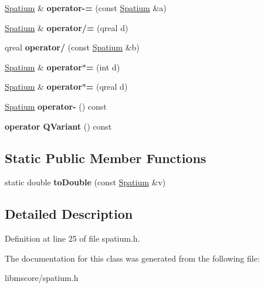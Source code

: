 \begin{DoxyCompactItemize}
\item 
\mbox{\label{class_ms_1_1_spatium_a58f8f9d523ea2f5b15345951e533bc24}} 
\hyperlink{class_ms_1_1_spatium}{Spatium} \& {\bfseries operator-\/=} (const \hyperlink{class_ms_1_1_spatium}{Spatium} \&a)
\item 
\mbox{\label{class_ms_1_1_spatium_aa618544034d2a8d408b3aad37be7c6df}} 
\hyperlink{class_ms_1_1_spatium}{Spatium} \& {\bfseries operator/=} (qreal d)
\item 
\mbox{\label{class_ms_1_1_spatium_a7d57a81bd0051e3364cdf82164e5c8df}} 
qreal {\bfseries operator/} (const \hyperlink{class_ms_1_1_spatium}{Spatium} \&b)
\item 
\mbox{\label{class_ms_1_1_spatium_a182fdadaf628a8658b4c7b4dd1a726c3}} 
\hyperlink{class_ms_1_1_spatium}{Spatium} \& {\bfseries operator$\ast$=} (int d)
\item 
\mbox{\label{class_ms_1_1_spatium_a1a97bd27476c723439bc07702ceef71c}} 
\hyperlink{class_ms_1_1_spatium}{Spatium} \& {\bfseries operator$\ast$=} (qreal d)
\item 
\mbox{\label{class_ms_1_1_spatium_aee2fbd8d4d49dce1097b6e91fe8d5b9b}} 
\hyperlink{class_ms_1_1_spatium}{Spatium} {\bfseries operator-\/} () const
\item 
\mbox{\label{class_ms_1_1_spatium_ad6ca4e1228ab699f9fef4e18fb14ba70}} 
{\bfseries operator Q\+Variant} () const
\end{DoxyCompactItemize}
\subsection*{Static Public Member Functions}
\begin{DoxyCompactItemize}
\item 
\mbox{\label{class_ms_1_1_spatium_a4e3bcd552101129c6de32426beef242a}} 
static double {\bfseries to\+Double} (const \hyperlink{class_ms_1_1_spatium}{Spatium} \&v)
\end{DoxyCompactItemize}


\subsection{Detailed Description}


Definition at line 25 of file spatium.\+h.



The documentation for this class was generated from the following file\+:\begin{DoxyCompactItemize}
\item 
libmscore/spatium.\+h\end{DoxyCompactItemize}
